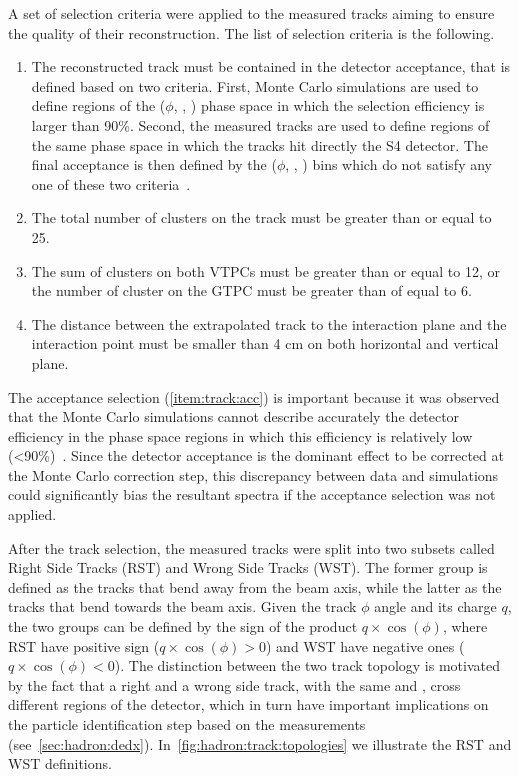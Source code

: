 A set of selection criteria were
applied to the measured tracks aiming to
ensure the quality of their reconstruction. 
The list of selection criteria is the following.
\begin{enumerate}[label=(\roman*)]
\item The reconstructed track must be contained in the detector acceptance,
  that is defined based on two criteria. First,
  Monte Carlo simulations are used to define regions of the ($\phi$, \pp, \pT)
  phase space in which the selection efficiency is larger than 90\%. Second,
  the measured tracks are used to define regions of the same phase space in
  which the tracks hit directly the S4 detector. The final acceptance is then defined
  by the ($\phi$, \pp, \pT) bins which do not satisfy any one of
  these two criteria~\cite{MartinThesis}. \label{item:track:acc} 
\item The total number of clusters on the track must be greater than or equal to 25.
\item The sum of clusters on both VTPCs must be greater than or equal to 12, or
  the number of cluster on the GTPC must be greater than of equal to 6.
\item The distance between the extrapolated track to the interaction plane and the
  interaction point must be smaller than 4 cm on both horizontal and vertical plane.
\end{enumerate}

The acceptance selection (\cref{item:track:acc}) is important because
it was observed that the Monte Carlo simulations cannot describe
accurately the detector efficiency in the phase space regions
in which this efficiency is relatively low (<90\%)~\cite{MartinThesis}.
Since the detector acceptance is the dominant effect to be corrected at the Monte Carlo
correction step, this discrepancy between data and simulations
could significantly bias the resultant spectra if the acceptance selection
was not applied.

After the track selection, the measured tracks were split
into two subsets called Right Side Tracks (RST) and Wrong Side Tracks (WST).
The former group is defined as the tracks that bend away from the
beam axis, while the latter as the tracks that bend towards the beam axis.
Given the track $\phi$ angle and its charge $q$, the two groups
can be defined by the sign of the product $q \times \cos(\phi)$, where
RST have positive sign ($q \times \cos(\phi)>0$)
and WST have negative ones ($q \times \cos(\phi)<0$).
The distinction between the two track topology is motivated by the
fact that a right and a wrong side track, with the same \pp and
\pT, cross different regions of the detector, 
which in turn have important implications on the
particle identification step based on the \dedx measurements
(see~\cref{sec:hadron:dedx}). 
In~\cref{fig:hadron:track:topologies} we illustrate the
RST and WST definitions.

